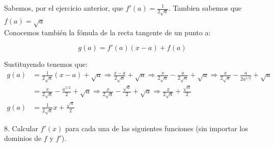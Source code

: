 \documentclass[12pt]{article}
\begin{document}
\begin{enumerate}[\hspace{9px} a)]
        Sabemos, por el ejercicio anterior, que \(f'(a)=\displaystyle\frac{1}{2\sqrt{a}}\). Tambien sabemos que \(f(a)=\sqrt{a}\)\\

        Conocemos también la fómula de la recta tangente de un punto a:

        \[g(a)=f'(a)(x-a)+f(a)\]

        Sustituyendo tenemos que:
        \begin{align*}
            g(a)&=\frac{1}{2\sqrt{a}}(x-a)+\sqrt{a} \Rightarrow \frac{x-a}{2\sqrt{a}}+\sqrt{a} \Rightarrow \frac{x}{2\sqrt{a}}-\frac{a}{2\sqrt{a}}+\sqrt{a} \Rightarrow \frac{x}{2\sqrt{a}}-\frac{a}{2a^{1/2}}+\sqrt{a}\\
            &=\frac{x}{2\sqrt{a}}-\frac{a^{1/2}}{2}+\sqrt{a} \Rightarrow \frac{x}{2\sqrt{a}}-\frac{\sqrt{a}}{2}+\sqrt{a} \Rightarrow \frac{x}{2\sqrt{a}}+\frac{\sqrt{a}}{2}\\
            g(a)&=\frac{1}{2\sqrt{a}}x+\frac{\sqrt{a}}{2}
        \end{align*}

\end{enumerate}

8. Calcular \(f'(x)\) para cada una de las siguientes funciones (sin importar los dominios de \(f\) y \(f'\)).
\end{document}
